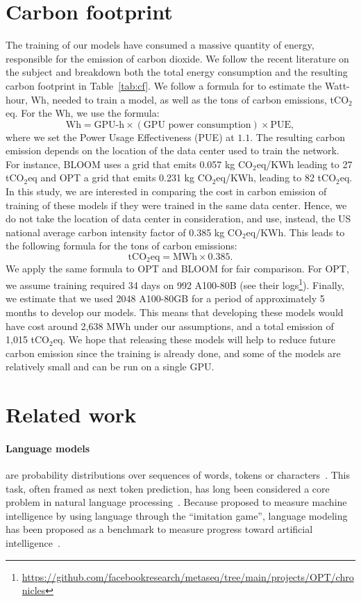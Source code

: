 \documentclass[11pt]{article}
\begin{document}
\section{Carbon footprint}

The training of our models have consumed a massive quantity of energy, responsible for the emission of carbon dioxide. 
We follow the recent literature on the subject and breakdown both the total energy consumption and the resulting carbon footprint in Table~\ref{tab:cf}.
We follow a formula for \citet{wu2022sustainable} to estimate the Watt-hour, Wh,  needed to train a model, as well as the tons of carbon emissions, tCO$_2$eq.
For the Wh, we use the formula:
$$\textrm{Wh} = \textrm{GPU-h}\times(\textrm{GPU power consumption}) \times \textrm{PUE},$$ where we set the Power Usage Effectiveness (PUE) at $1.1$.
The resulting carbon emission depends on the location of the data center used to train the network. For instance, BLOOM uses a grid that emits 0.057 kg CO$_2$eq/KWh leading to 27 tCO$_2$eq and OPT a grid that emits 0.231 kg CO$_2$eq/KWh, leading to 82 tCO$_2$eq.
In this study, we are interested in comparing the cost in carbon emission of training of these models if they were trained in the same data center.
Hence, we do not take the location of data center in consideration, and use, instead, the US national average carbon intensity factor of 0.385 kg CO$_2$eq/KWh.
This leads to the following formula for the tons of carbon emissions:
$$\textrm{tCO}_2\textrm{eq}=\textrm{MWh}\times0.385.$$
We apply the same formula to OPT and BLOOM for fair comparison.
For OPT, we assume training required 34 days on 992 A100-80B (see their logs\footnote{\url{https://github.com/facebookresearch/metaseq/tree/main/projects/OPT/chronicles}}).
Finally, we estimate that we used 2048 A100-80GB for a period of approximately 5 months to develop our models.
This means that developing these models would have cost around 2,638 MWh under our assumptions, and a total emission of 1,015 tCO$_2$eq.
We hope that releasing these models will help to reduce future carbon emission since the training is already done, and some of the models are relatively small and can be run on a single GPU.

\section{Related work}
\paragraph{Language models} are probability distributions over sequences of words, tokens or characters~\citep{shannon1948mathematical,shannon1951prediction}.
This task, often framed as next token prediction, has long been considered a core problem in natural language processing~\citep{bahl1983maximum,brown1990statistical}.
Because \citet{turing1950computing} proposed to measure machine intelligence by using language through the ``imitation game'', language modeling has been proposed as a benchmark to measure progress toward artificial intelligence~\citep{mahoney1999text}.
\end{document}
